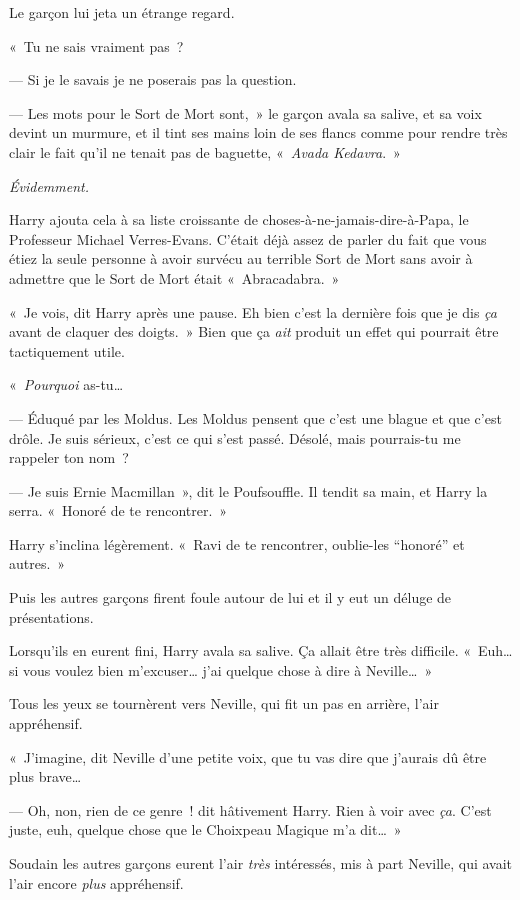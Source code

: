 Le garçon lui jeta un étrange regard.

«~Tu ne sais vraiment pas~?

--- Si je le savais je ne poserais pas la question.

--- Les mots pour le Sort de Mort sont,~» le garçon avala sa salive, et sa voix devint un murmure, et il tint ses mains loin de ses flancs comme pour rendre très clair le fait qu'il ne tenait pas de baguette, «~\emph{Avada Kedavra}.~»

\emph{Évidemment.}

Harry ajouta cela à sa liste croissante de choses-à-ne-jamais-dire-à-Papa, le Professeur Michael Verres-Evans. C'était déjà assez de parler du fait que vous étiez la seule personne à avoir survécu au terrible Sort de Mort sans avoir à admettre que le Sort de Mort était «~Abracadabra.~»

«~Je vois, dit Harry après une pause. Eh bien c'est la dernière fois que je dis \emph{ça} avant de claquer des doigts.~» Bien que ça \emph{ait} produit un effet qui pourrait être tactiquement utile.

«~\emph{Pourquoi} as-tu…

--- Éduqué par les Moldus. Les Moldus pensent que c'est une blague et que c'est drôle. Je suis sérieux, c'est ce qui s'est passé. Désolé, mais pourrais-tu me rappeler ton nom~?

--- Je suis Ernie Macmillan~», dit le Poufsouffle. Il tendit sa main, et Harry la serra. «~Honoré de te rencontrer.~»

Harry s'inclina légèrement. «~Ravi de te rencontrer, oublie-les “honoré” et autres.~»

Puis les autres garçons firent foule autour de lui et il y eut un déluge de présentations.

Lorsqu'ils en eurent fini, Harry avala sa salive. Ça allait être très difficile. «~Euh… si vous voulez bien m'excuser… j'ai quelque chose à dire à Neville…~»

Tous les yeux se tournèrent vers Neville, qui fit un pas en arrière, l'air appréhensif.

«~J'imagine, dit Neville d'une petite voix, que tu vas dire que j'aurais dû être plus brave…

--- Oh, non, rien de ce genre~! dit hâtivement Harry. Rien à voir avec \emph{ça}. C'est juste, euh, quelque chose que le Choixpeau Magique m'a dit…~»

Soudain les autres garçons eurent l'air \emph{très} intéressés, mis à part Neville, qui avait l'air encore \emph{plus} appréhensif.

